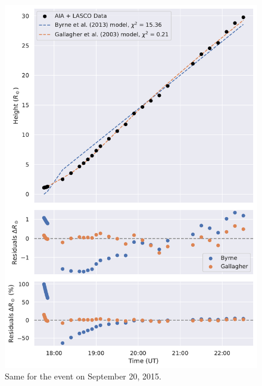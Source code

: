 \begin{figure}[!htp]
	\centering
	\includegraphics[width=0.8\hsize]{chapter2/figs/appendix/height_profile_residuals_aia_lasco_150920_01.pdf}
	\caption{Same for the event on September 20, 2015.}
\end{figure}

